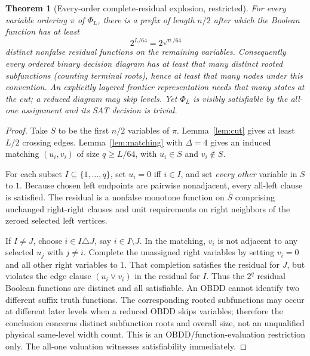\documentclass[11pt]{article}
\newtheorem{theorem}{Theorem}
\begin{document}
\begin{theorem}[Every-order complete-residual explosion, restricted]\label{thm:residual}
For every variable ordering $\pi$ of $\Phi_L$, there is a prefix of length $n/2$ after which the Boolean function has at least
\[
 \boxed{2^{L/64}=2^{\sqrt n/64}}
\]
distinct nonfalse residual functions on the remaining variables. Consequently every ordered binary decision diagram has at least that many distinct rooted subfunctions (counting terminal roots), hence at least that many nodes under this convention. An explicitly layered frontier representation needs that many states at the cut; a reduced diagram may skip levels. Yet $\Phi_L$ is visibly satisfiable by the all-one assignment and its SAT decision is trivial.
\end{theorem}
\begin{proof}
Take $S$ to be the first $n/2$ variables of $\pi$. Lemma~\ref{lem:cut} gives at least $L/2$ crossing edges. Lemma~\ref{lem:matching} with $\Delta=4$ gives an induced matching $(u_i,v_i)$ of size $q\ge L/64$, with $u_i\in S$ and $v_i\notin S$.

For each subset $I\subseteq\{1,\ldots,q\}$, set $u_i=0$ iff $i\in I$, and set \emph{every other} variable in $S$ to $1$. Because chosen left endpoints are pairwise nonadjacent, every all-left clause is satisfied. The residual is a nonfalse monotone function on $\overline S$ comprising unchanged right-right clauses and unit requirements on right neighbors of the zeroed selected left vertices.

If $I\ne J$, choose $i\in I\triangle J$, say $i\in I\setminus J$. In the matching, $v_i$ is not adjacent to any selected $u_j$ with $j\ne i$. Complete the unassigned right variables by setting $v_i=0$ and all other right variables to $1$. That completion satisfies the residual for $J$, but violates the edge clause $(u_i\vee v_i)$ in the residual for $I$. Thus the $2^q$ residual Boolean functions are distinct and all satisfiable. An OBDD cannot identify two different suffix truth functions. The corresponding rooted subfunctions may occur at different later levels when a reduced OBDD skips variables; therefore the conclusion concerns distinct subfunction roots and overall size, not an unqualified physical same-level width count. This is an OBDD/function-evaluation restriction only. The all-one valuation witnesses satisfiability immediately.
\end{proof}
\end{document}
